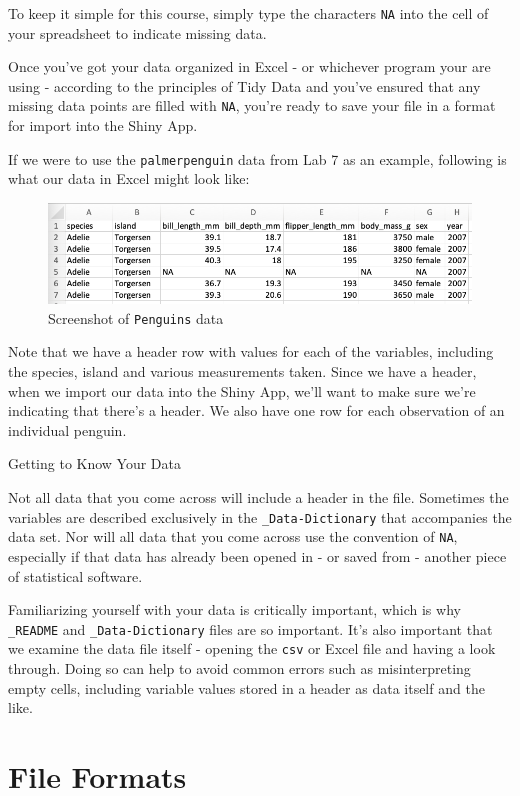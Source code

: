 \documentclass[
]{book}
\begin{document}
To keep it simple for this course, simply type the characters \texttt{NA} into the cell of your spreadsheet to indicate missing data.

Once you've got your data organized in Excel - or whichever program your are using - according to the principles of Tidy Data and you've ensured that any missing data points are filled with \texttt{NA}, you're ready to save your file in a format for import into the Shiny App.

If we were to use the \texttt{palmerpenguin} data from Lab 7 as an example, following is what our data in Excel might look like:

\begin{figure}
\centering
\includegraphics{figures_images/Penguins-Excel.png}
\caption{Screenshot of \texttt{Penguins} data}
\end{figure}

Note that we have a header row with values for each of the variables, including the species, island and various measurements taken. Since we have a header, when we import our data into the Shiny App, we'll want to make sure we're indicating that there's a header. We also have one row for each observation of an individual penguin.

Getting to Know Your Data

Not all data that you come across will include a header in the file. Sometimes the variables are described exclusively in the \texttt{\_Data-Dictionary} that accompanies the data set. Nor will all data that you come across use the convention of \texttt{NA}, especially if that data has already been opened in - or saved from - another piece of statistical software.

Familiarizing yourself with your data is critically important, which is why \texttt{\_README} and \texttt{\_Data-Dictionary} files are so important. It's also important that we examine the data file itself - opening the \texttt{csv} or Excel file and having a look through. Doing so can help to avoid common errors such as misinterpreting empty cells, including variable values stored in a header as data itself and the like.

\hypertarget{file-formats}{%
\section*{File Formats}\label{file-formats}}
\end{document}

